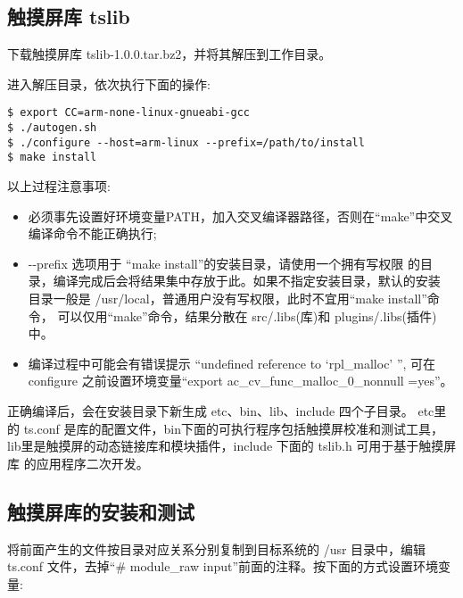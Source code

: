 \subsection{触摸屏库 tslib}
	下载触摸屏库 tslib-1.0.0.tar.bz2，并将其解压到工作目录。

	进入解压目录，依次执行下面的操作:

\begin{boxedminipage}{.9\textwidth}
\begin{verbatim}
$ export CC=arm-none-linux-gnueabi-gcc
$ ./autogen.sh
$ ./configure --host=arm-linux --prefix=/path/to/install
$ make install
\end{verbatim}
\end{boxedminipage}

以上过程注意事项:
\begin{itemize}
  \item 必须事先设置好环境变量PATH，加入交叉编译器路径，否则在``make''中交叉
	编译命令不能正确执行;
  \item -{}-prefix 选项用于 ``make install''的安装目录，请使用一个拥有写权限
	的目录，编译完成后会将结果集中存放于此。如果不指定安装目录，默认的安装
	目录一般是 /usr/local，普通用户没有写权限，此时不宜用``make install''命令，
	可以仅用``make''命令，结果分散在 src/.libs(库)和 plugins/.libs(插件)中。
  \item 编译过程中可能会有错误提示 ``undefined reference to `rpl\_malloc' '',
	可在 configure 之前设置环境变量``export ac\_cv\_func\_malloc\_0\_nonnull
	=yes''。
\end{itemize}

	正确编译后，会在安装目录下新生成 etc、bin、lib、include 四个子目录。
etc里的 ts.conf 是库的配置文件，bin下面的可执行程序包括触摸屏校准和测试工具，
lib里是触摸屏的动态链接库和模块插件，include 下面的 tslib.h 可用于基于触摸屏库
的应用程序二次开发。

\subsection{触摸屏库的安装和测试}
	将前面产生的文件按目录对应关系分别复制到目标系统的 /usr 目录中，编辑 ts.conf
文件，去掉``\# module\_raw input''前面的注释。按下面的方式设置环境变量:

